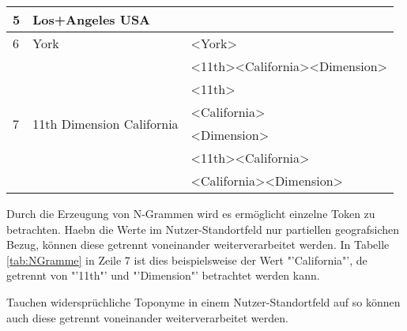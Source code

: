 \begin{table}[h]
\begin{tabular}{|l|l|l|}
					5                               & Los+Angeles USA                             &                                                                                          \\ \hline \hline
					6                               & York                                        & \textless York\textgreater                                                                \\ \hline \hline
					\multirow{6}{*}{7}              & \multirow{6}{*}{11th Dimension California}  & \textless 11th\textgreater\textless California\textgreater\textless Dimension\textgreater \\ \cline{3-3} 
					                                &                                             & \textless 11th\textgreater                                                                \\ \cline{3-3} 
					                                &                                             & \textless California\textgreater                                                         \\ \cline{3-3} 
					                                &                                             & \textless Dimension\textgreater                                                          \\ \cline{3-3} 
					                                &                                             & \textless 11th\textgreater\textless California\textgreater                                 \\ \cline{3-3} 
					                                &                                             & \textless California\textgreater\textless Dimension\textgreater                           \\ \hline
					\end{tabular}
					\end{table}

				Durch die Erzeugung von N-Grammen wird es ermöglicht einzelne Token zu betrachten.
				Haebn die Werte im Nutzer-Standortfeld nur partiellen geografsichen Bezug, können diese getrennt voneinander weiterverarbeitet werden.
				In Tabelle \ref{tab:NGramme} in Zeile 7 ist dies beispielsweise der Wert "'California"', de getrennt von "'11th"' und "'Dimension"' betrachtet werden kann. 
				
				Tauchen widersprüchliche Toponyme in einem Nutzer-Standortfeld auf so können auch diese getrennt voneinander weiterverarbeitet werden.

